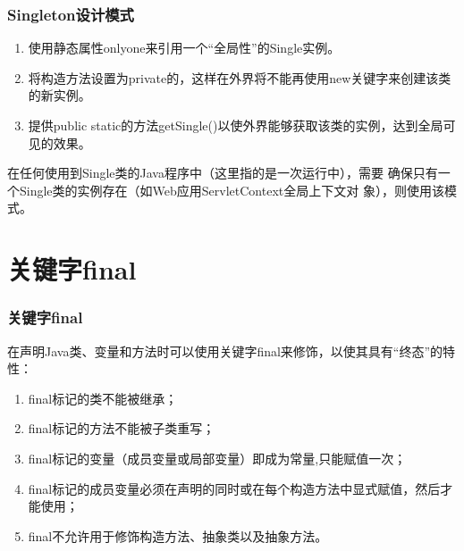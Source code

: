 \begin{frame}[fragile] %
  \frametitle{Singleton设计模式}


  \begin{enumerate}[<+-| alert@+>]
  \item 使用静态属性onlyone来引用一个“全局性”的Single实例。
  \item 将构造方法设置为private的，这样在外界将不能再使用new关键字来创建该类的新实例。
  \item 提供public static的方法getSingle()以使外界能够获取该类的实例，达到全局可见的效果。
  \end{enumerate}

  \pause

  {\kai 在任何使用到Single类的Java程序中（这里指的是一次运行中），需要
    确保只有一个Single类的实例存在（如Web应用ServletContext全局上下文对
    象），则使用该模式。}


\end{frame}

\section{关键字final}
\begin{frame}[fragile] %
\frametitle{关键字final}
在声明Java类、变量和方法时可以使用关键字final来修饰，以使其具有“终态”的特性：

\begin{enumerate}\kai
\item final标记的类不能被继承；
\item final标记的方法不能被子类重写；
\item final标记的变量（成员变量或局部变量）即成为常量,只能赋值一次；
\item final标记的成员变量必须在声明的同时或在每个构造方法中显式赋值，然后才能使用；
\item final不允许用于修饰构造方法、抽象类以及抽象方法。
\end{enumerate}
\end{frame}

